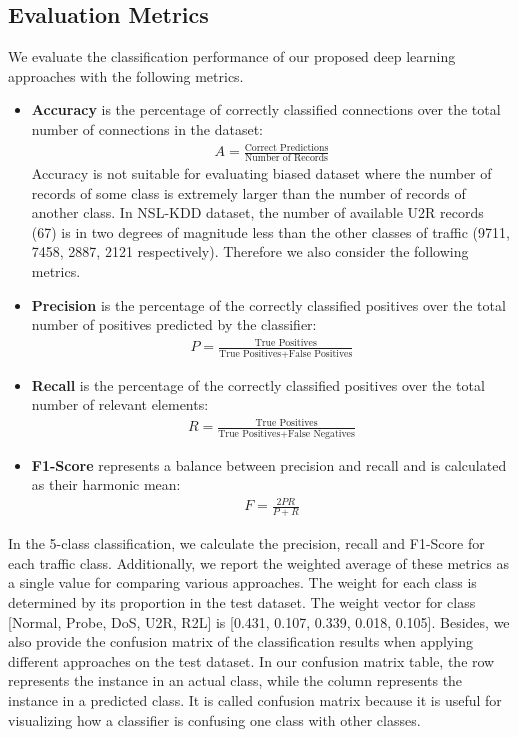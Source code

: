 \subsection{Evaluation Metrics}
We evaluate the classification performance of our proposed deep learning approaches
with the following metrics.
\begin{itemize}
    \item \textbf{Accuracy} is the percentage of correctly classified connections
        over the total number of connections in the dataset:
        \begin{align}
            A = \frac{\text{Correct Predictions}}{\text{Number of Records}}
        \end{align} 
        Accuracy is not suitable for evaluating biased dataset where the number
        of records of some class is extremely larger than the number of
        records of another class.
        In NSL-KDD dataset, the number of available U2R records (67)
        is in two degrees of magnitude less than the other classes of traffic
        (9711, 7458, 2887, 2121 respectively).
        Therefore we also consider the following metrics.
    \item \textbf{Precision} is the percentage of the correctly classified positives over
        the total number of positives predicted by the classifier:
                \begin{align}
                    P = \frac{\text{True Positives}}{\text{True Positives} + \text{False Positives}}
                \end{align}
    \item \textbf{Recall} is the percentage of the correctly classified positives over
        the total number of relevant elements:
                \begin{align}
                    R = \frac{\text{True Positives}}{\text{True Positives} + \text{False Negatives}}
                \end{align}
    \item \textbf{F1-Score} represents a balance between precision and recall and is calculated
        as their harmonic mean:
                \begin{align}
                    F = \frac{2PR}{P + R}
                \end{align}
\end{itemize}
In the 5-class classification, we calculate the precision, recall and F1-Score for each traffic class.
Additionally, we report the weighted average of these metrics as a single value for comparing various approaches.
The weight for each class is determined by its proportion in the test dataset.
The weight vector for class [Normal, Probe, DoS, U2R, R2L] is [0.431, 0.107, 0.339, 0.018, 0.105].
Besides, we also provide the confusion matrix of the classification results when applying
different approaches on the test dataset.
In our confusion matrix table, the row represents the instance in an actual class,
while the column represents the instance in a predicted class.
It is called confusion matrix because it is useful for visualizing how a classifier
is confusing one class with other classes.


